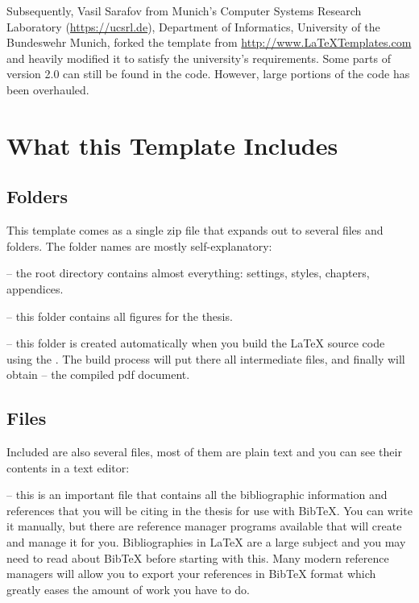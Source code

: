 Subsequently, Vasil Sarafov from Munich's Computer Systems Research Laboratory (\url{https://ucsrl.de}), Department of Informatics, University of the Bundeswehr Munich, forked the template from \url{http://www.LaTeXTemplates.com} and heavily modified it to satisfy the university's requirements.
Some parts of version 2.0 can still be found in the  code.
However, large portions of the code has been overhauled.

\section{What this Template Includes}

\subsection{Folders}

This template comes as a single zip file that expands out to several files and folders. The folder names are mostly self-explanatory:

 -- the root directory contains almost everything: settings, styles, chapters, appendices.

 -- this folder contains all figures for the thesis.

 -- this folder is created automatically when you build the \LaTeX{} source code using the .
The build process will put there all intermediate files, and finally will obtain  -- the compiled pdf document.

\subsection{Files}

Included are also several files, most of them are plain text and you can see their contents in a text editor:

 -- this is an important file that contains all the bibliographic information and references that you will be citing in the thesis for use with BibTeX. You can write it manually, but there are reference manager programs available that will create and manage it for you. Bibliographies in \LaTeX{} are a large subject and you may need to read about BibTeX before starting with this. Many modern reference managers will allow you to export your references in BibTeX format which greatly eases the amount of work you have to do.

